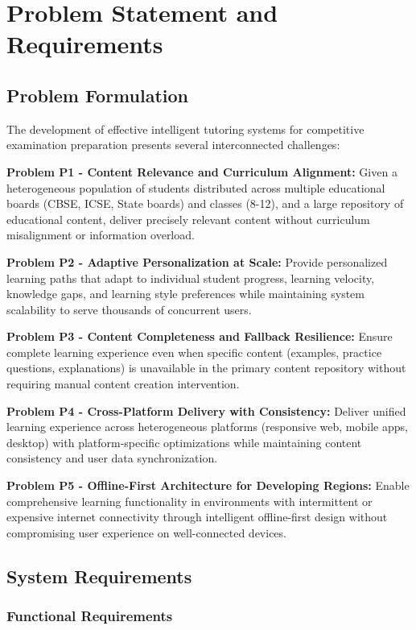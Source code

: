 \documentclass[10pt,conference,compsocconf]{IEEEtran}
\begin{document}
\section{Problem Statement and Requirements}
\label{sec:problem}

\subsection{Problem Formulation}

The development of effective intelligent tutoring systems for competitive examination preparation presents several interconnected challenges:

\textbf{Problem P1 - Content Relevance and Curriculum Alignment:} Given a heterogeneous population of students distributed across multiple educational boards (CBSE, ICSE, State boards) and classes (8-12), and a large repository of educational content, deliver precisely relevant content without curriculum misalignment or information overload.

\textbf{Problem P2 - Adaptive Personalization at Scale:} Provide personalized learning paths that adapt to individual student progress, learning velocity, knowledge gaps, and learning style preferences while maintaining system scalability to serve thousands of concurrent users.

\textbf{Problem P3 - Content Completeness and Fallback Resilience:} Ensure complete learning experience even when specific content (examples, practice questions, explanations) is unavailable in the primary content repository without requiring manual content creation intervention.

\textbf{Problem P4 - Cross-Platform Delivery with Consistency:} Deliver unified learning experience across heterogeneous platforms (responsive web, mobile apps, desktop) with platform-specific optimizations while maintaining content consistency and user data synchronization.

\textbf{Problem P5 - Offline-First Architecture for Developing Regions:} Enable comprehensive learning functionality in environments with intermittent or expensive internet connectivity through intelligent offline-first design without compromising user experience on well-connected devices.

\subsection{System Requirements}

\subsubsection{Functional Requirements}
\end{document}
